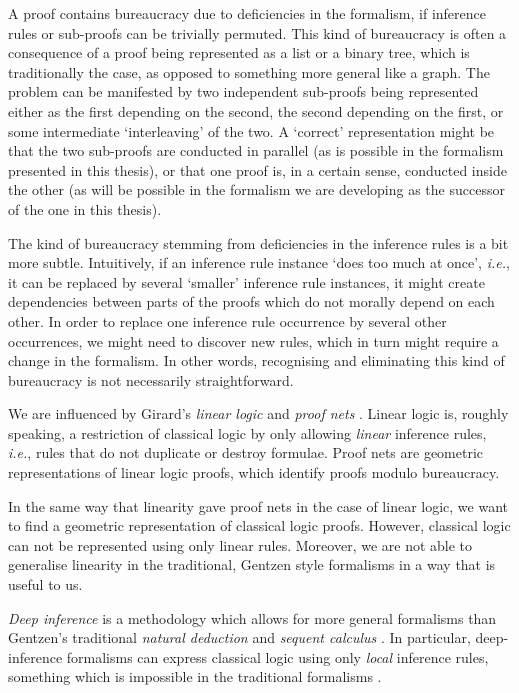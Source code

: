 A proof contains bureaucracy due to deficiencies in the formalism, if inference rules or sub-proofs can be trivially permuted. This kind of bureaucracy is often a consequence of a proof being represented as a list or a binary tree, which is traditionally the case, as opposed to something more general like a graph. The problem can be manifested by two independent sub-proofs being represented either as the first depending on the second, the second depending on the first, or some intermediate `interleaving' of the two. A `correct' representation might be that the two sub-proofs are conducted in parallel (as is possible in the formalism presented in this thesis), or that one proof is, in a certain sense, conducted inside the other (as will be possible in the formalism we are developing as the successor of the one in this thesis).

The kind of bureaucracy stemming from deficiencies in the inference rules is a bit more subtle. Intuitively, if an inference rule instance `does too much at once', \emph{i.e.}, it can be replaced by several `smaller' inference rule instances, it might create dependencies between parts of the proofs which do not morally depend on each other. In order to replace one inference rule occurrence by several other occurrences, we might need to discover new rules, which in turn might require a change in the formalism. In other words, recognising and eliminating this kind of bureaucracy is not necessarily straightforward.


We are influenced by Girard's \emph{linear logic} and \emph{proof nets} \cite{Gira:87:Linear-L:wm}. Linear logic is, roughly speaking, a restriction of classical logic by only allowing \emph{linear} inference rules, \emph{i.e.}, rules that do not duplicate or destroy formulae. Proof nets are geometric representations of linear logic proofs, which identify proofs modulo bureaucracy.

In the same way that linearity gave proof nets in the case of linear logic, we want to find a geometric representation of classical logic proofs. However, classical logic can not be represented using only linear rules. Moreover, we are not able to generalise linearity in the traditional, Gentzen style formalisms in a way that is useful to us.

\emph{Deep inference} \cite{Gugl:06:A-System:kl} is a methodology which allows for more general formalisms than Gentzen's traditional \emph{natural deduction} and \emph{sequent calculus} \cite{Gent:69:Investig:xi}. In particular, deep-inference formalisms can express classical logic using only \emph{local} \cite{BrunTiu:01:A-Local-:mz} inference rules, something which is impossible in the traditional formalisms \cite{Brun:03:Two-Rest:mn}.


